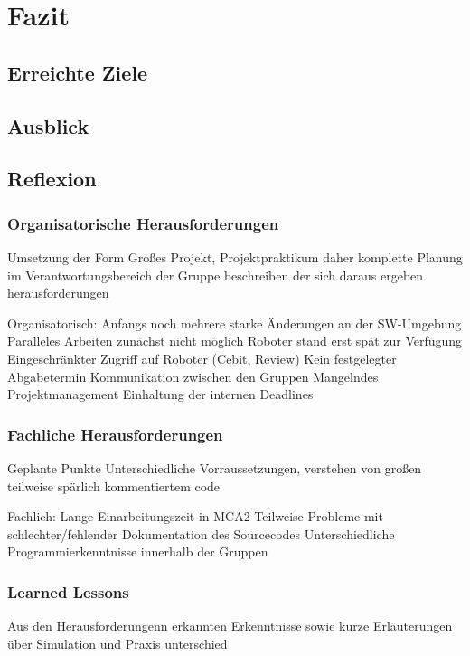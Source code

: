 
\chapter{Fazit}

\section{Erreichte Ziele}
\authorsection{\editordummy}

\section{Ausblick}
\authorsection{\editordummy}

\section{Reflexion}
\authorsection{\editordummy}

\subsection{Organisatorische Herausforderungen}

Umsetzung der Form Großes Projekt, Projektpraktikum daher komplette Planung im
Verantwortungsbereich der Gruppe beschreiben der sich daraus ergeben
herausforderungen

 Organisatorisch:
        Anfangs noch mehrere starke Änderungen an der SW-Umgebung
        Paralleles Arbeiten zunächst nicht möglich
        Roboter stand erst spät zur Verfügung
        Eingeschränkter Zugriff auf Roboter (Cebit, Review)
        Kein festgelegter Abgabetermin
        Kommunikation zwischen den Gruppen
        Mangelndes Projektmanagement
        Einhaltung der internen Deadlines
\subsection{Fachliche Herausforderungen}

Geplante Punkte Unterschiedliche Vorraussetzungen, verstehen von großen
teilweise spärlich kommentiertem code

 Fachlich:
        Lange Einarbeitungszeit in MCA2
        Teilweise Probleme mit schlechter/fehlender Dokumentation des Sourcecodes
        Unterschiedliche Programmierkenntnisse innerhalb der Gruppen

\subsection{Learned Lessons}

Aus den Herausforderungenn erkannten Erkenntnisse sowie kurze Erläuterungen über
Simulation und Praxis unterschied
